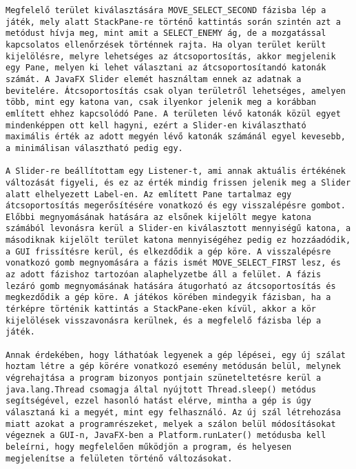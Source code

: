 \begin{verbatim}
Megfelelő terület kiválasztására MOVE_SELECT_SECOND fázisba lép a játék, mely alatt StackPane-re történő kattintás során szintén azt a metódust hívja meg, mint amit a SELECT_ENEMY ág, de a mozgatással kapcsolatos ellenőrzések történnek rajta. Ha olyan terület került kijelölésre, melyre lehetséges az átcsoportosítás, akkor megjelenik egy Pane, melyen ki lehet választani az átcsoportosítandó katonák számát. A JavaFX Slider elemét használtam ennek az adatnak a bevitelére. Átcsoportosítás csak olyan területről lehetséges, amelyen több, mint egy katona van, csak ilyenkor jelenik meg a korábban említett ehhez kapcsolódó Pane. A területen lévő katonák közül egyet mindenképpen ott kell hagyni, ezért a Slider-en kiválasztható maximális érték az adott megyén lévő katonák számánál egyel kevesebb, a minimálisan választható pedig egy. 

A Slider-re beállítottam egy Listener-t, ami annak aktuális értékének változását figyeli, és ez az érték mindig frissen jelenik meg a Slider alatt elhelyezett Label-en. Az említett Pane tartalmaz egy átcsoportosítás megerősítésére vonatkozó és egy visszalépésre gombot. Előbbi megnyomásának hatására az elsőnek kijelölt megye katona számából levonásra kerül a Slider-en kiválasztott mennyiségű katona, a másodiknak kijelölt terület katona mennyiségéhez pedig ez hozzáadódik, a GUI frissítésre kerül, és elkezdődik a gép köre. A visszalépésre vonatkozó gomb megnyomására a fázis ismét MOVE_SELECT_FIRST lesz, és az adott fázishoz tartozóan alaphelyzetbe áll a felület. A fázis lezáró gomb megnyomásának hatására átugorható az átcsoportosítás és megkezdődik a gép köre. A játékos körében mindegyik fázisban, ha a térképre történik kattintás a StackPane-eken kívül, akkor a kör kijelölések visszavonásra kerülnek, és a megfelelő fázisba lép a játék. 

Annak érdekében, hogy láthatóak legyenek a gép lépései, egy új szálat hoztam létre a gép körére vonatkozó esemény metódusán belül, melynek végrehajtása a program bizonyos pontjain szüneteltetésre kerül a java.lang.Thread csomagja által nyújtott Thread.sleep() metódus segítségével, ezzel hasonló hatást elérve, mintha a gép is úgy választaná ki a megyét, mint egy felhasználó. Az új szál létrehozása miatt azokat a programrészeket, melyek a szálon belül módosításokat végeznek a GUI-n, JavaFX-ben a Platform.runLater() metódusba kell beleírni, hogy megfelelően működjön a program, és helyesen megjelenítse a felületen történő változásokat. 


\end{verbatim}
